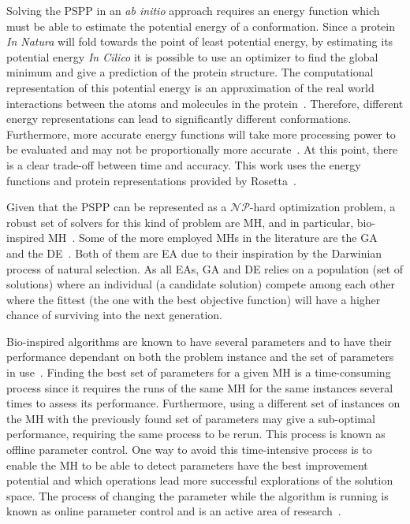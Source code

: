 Solving the \ac{PSPP} in an \textit{ab initio} approach requires an energy function
which must be able to estimate the potential energy of a conformation. Since a
protein \textit{In Natura} will fold towards the point of least potential
energy, by estimating its potential energy \textit{In Cilico} it is possible to
use an optimizer to find the global minimum and give a prediction of the
protein structure. The computational representation of this potential energy is
an approximation of the real world interactions between the atoms and molecules
in the protein~\cite{alford2017rosetta}. Therefore,
different energy representations can lead to
significantly different conformations. Furthermore, more accurate energy
functions will take more processing power to be evaluated and may not be
proportionally more accurate~\cite{xu2012ab}. At this point,
there is a clear trade-off between time and accuracy.
This work uses the energy functions and protein representations provided by
Rosetta~\cite{rohl2004protein,leaver2011rosetta3}.

Given that the \ac{PSPP} can be represented as a $\mathcal{NP}$-hard optimization
problem, a robust set of solvers for this kind of problem are
\ac{MH}, and in particular, bio-inspired \ac{MH}~\cite{kar2016bio}.
Some of the more employed \ac{MH}s in the literature are the
\ac{GA}~\cite{holland1992genetic} and the
\ac{DE}~\cite{storn1997differential}. Both of them are
\ac{EA} due to their inspiration by the Darwinian process of natural
selection. As all \ac{EA}s, \ac{GA} and \ac{DE} relies on a population (set of solutions) where an
individual (a candidate solution) compete among each other where the fittest (the one
with the best objective function) will have a higher chance of surviving into
the next generation.

Bio-inspired algorithms are known to have several parameters and to have their
performance dependant on both the problem instance and the set of parameters in
use~\cite{eiben2007parameter}.
Finding the best set of parameters for a given \ac{MH} is a time-consuming
process since it requires the runs of the same \ac{MH} for the same instances
several times to assess its performance. Furthermore, using a different set of
instances on the \ac{MH} with the previously found set of parameters may give a
sub-optimal performance, requiring the same process to be rerun.  This process
is known as offline parameter control. One way to avoid this time-intensive
process is to enable the \ac{MH} to be able to detect parameters have the best
improvement potential and which operations lead more successful explorations of
the solution space. The process of changing the parameter while the algorithm
is running is known as online parameter control and is an active area of
research~\cite{parpinelli18review}.

